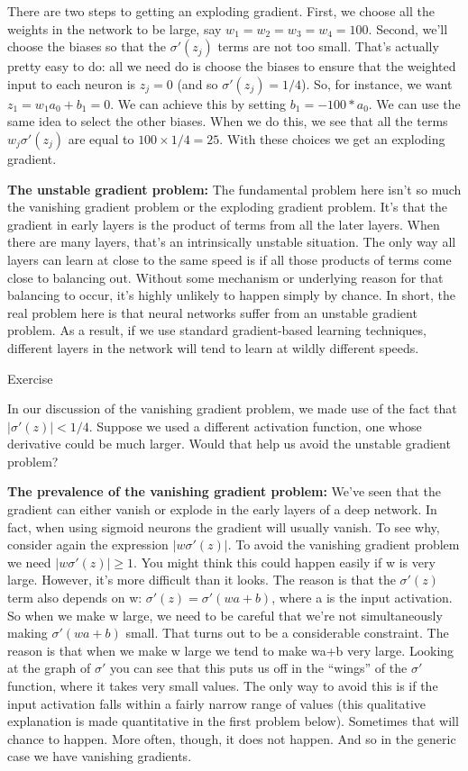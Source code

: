 \documentclass[a4paper,twoside,10pt]{book}
\begin{document}
There are two steps to getting an exploding gradient. First, we choose all the weights in the network to be large, say $w_1=w_2=w_3=w_4=100$. Second, we'll choose the biases so that the $\sigma'(z_j)$ terms are not too small. That's actually pretty easy to do: all we need do is choose the biases to ensure that the weighted input to each neuron is $z_j=0$ (and so $\sigma'(z_j)=1/4$). So, for instance, we want $z_1=w_1a_0+b_1=0$. We can achieve this by setting $b_1=−100\ast a_0$. We can use the same idea to select the other biases. When we do this, we see that all the terms $w_j\sigma'(z_j)$ are equal to $100\times1/4=25$. With these choices we get an exploding gradient.

\textbf{The unstable gradient problem:} The fundamental problem here isn't so much the vanishing gradient problem or the exploding gradient problem. It's that the gradient in early layers is the product of terms from all the later layers. When there are many layers, that's an intrinsically unstable situation. The only way all layers can learn at close to the same speed is if all those products of terms come close to balancing out. Without some mechanism or underlying reason for that balancing to occur, it's highly unlikely to happen simply by chance. In short, the real problem here is that neural networks suffer from an unstable gradient problem. As a result, if we use standard gradient-based learning techniques, different layers in the network will tend to learn at wildly different speeds.

\begin{exercize}{Exercise}
\item In our discussion of the vanishing gradient problem, we made use of the fact that $|\sigma'(z)|<1/4$. Suppose we used a different activation function, one whose derivative could be much larger. Would that help us avoid the unstable gradient problem?
\end{exercize}
\textbf{The prevalence of the vanishing gradient problem:} We've seen that the gradient can either vanish or explode in the early layers of a deep network. In fact, when using sigmoid neurons the gradient will usually vanish. To see why, consider again the expression $|w\sigma'(z)|$. To avoid the vanishing gradient problem we need $|w\sigma'(z)|\geq1$. You might think this could happen easily if w is very large. However, it's more difficult than it looks. The reason is that the $\sigma'(z)$ term also depends on w: $\sigma'(z)=\sigma'(wa+b)$, where a is the input activation. So when we make w large, we need to be careful that we're not simultaneously making $\sigma'(wa+b)$ small. That turns out to be a considerable constraint. The reason is that when we make w large we tend to make wa+b very large. Looking at the graph of $\sigma'$ you can see that this puts us off in the ``wings'' of the $\sigma'$ function, where it takes very small values. The only way to avoid this is if the input activation falls within a fairly narrow range of values (this qualitative explanation is made quantitative in the first problem below). Sometimes that will chance to happen. More often, though, it does not happen. And so in the generic case we have vanishing gradients.
\end{document}
